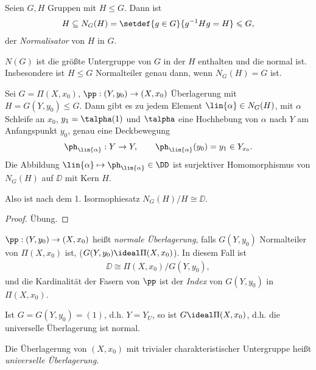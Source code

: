 \begin{defnn}
Seien $G,H$ Gruppen mit $H\leqslant G$. Dann ist
\begin{align*}
H\subseteq N_G(H) = \setdef{g\in G}{g^{-1}Hg = H}\leqslant G, 
\end{align*}
der \emph{Normalisator} von $H$ in $G$.

$N(G)$ ist die größte Untergruppe von $G$ in der $H$ enthalten und die normal
ist. Insbesondere ist $H\leqslant G$ Normalteiler genau dann, wenn
$N_G(H) = G$ ist.\fishhere
\end{defnn}

\begin{prop}
Sei $G=\Pi(X,x_0)$, $\pp: (Y,y_0)\to (X,x_0)$ Überlagerung mit
$H=G(Y,y_0)\leqslant G$. Dann gibt es zu jedem Element $\lin{\alpha}\in
N_G(H)$, mit $\alpha$ Schleife an $x_0$, $y_1=\talpha(1)$ und $\talpha$
eine Hochhebung von $\alpha$ nach $Y$ am Anfangspunkt $y_0$, genau eine
Deckbewegung
\begin{align*}
\ph_{\lin{\alpha}}: Y\to Y,\qquad \ph_{\lin{\alpha}}(y_0) = y_1 \in
Y_{x_0}.
\end{align*}
Die Abbildung $\lin{\alpha}\mapsto \ph_{\lin{\alpha}}\in\DD$ ist surjektiver
Homomorphismus von $N_G(H)$ auf $\DD$ mit Kern $H$.

Also ist nach dem 1. Isormophiesatz $N_G(H)/H\cong \DD$.\fishhere
\end{prop}
\begin{proof}
Übung.\qedhere
\end{proof}

\begin{defn}
\label{defn:3.5.11}
$\pp: (Y,y_0)\to (X,x_0)$ heißt \emph{normale Überlagerung}, falls
$G(Y,y_0)$ Normalteiler von $\Pi(X,x_0)$ ist, ($G(Y,y_0) \ideal \Pi(X,x_0)$).
In diesem Fall ist 
\begin{align*}
\DD\cong \Pi(X,x_0)/G(Y,y_0),
\end{align*}
und die Kardinalität der Fasern von $\pp$ ist der \emph{Index} von $G(Y,y_0)$
in $\Pi(X,x_0)$.\fishhere
\end{defn}

\begin{bemn}[Spezialfall:]
Ist $G=G(Y,y_0)=(1)$, d.h. $Y=Y_U$, so ist $G\ideal \Pi(X,x_0)$, d.h. die
universelle Überlagerung ist normal.\maphere
\end{bemn}

\begin{defn}
\label{defn:3.5.12}
Die Überlagerung von $(X,x_0)$ mit trivialer charakteristischer Untergruppe
heißt \emph{universelle Überlagerung}.\fishhere
\end{defn}


